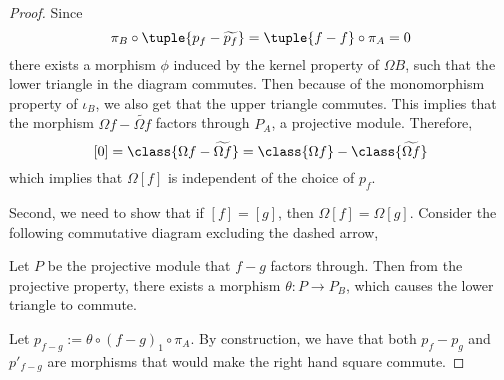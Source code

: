 \begin{proof}
    Since
    \[
        \pi_B \circ \tuple{p_f - \widetilde{p_f}} = \tuple{f - f} \circ \pi_A = 0
    \]
    there exists a morphism \( \phi \) induced by the kernel property of \( \Omega B \), such that the lower triangle in the diagram commutes. Then because of the monomorphism property of \( \iota_B \), we also get that the upper triangle commutes. This implies that the morphism \( \Omega f - \widetilde{\Omega f} \) factors through \( P_A \), a projective module. Therefore,
    \[
        [0] = \class{\Omega f - \widetilde{\Omega f}} = \class{\Omega f} - \class{\widetilde{\Omega f}}
    \]
    which implies that \( \Omega [f] \) is independent of the choice of \( p_f \).

    Second, we need to show that if \( [f] = [g] \), then \( \Omega [f] = \Omega [g] \). Consider the following commutative diagram excluding the dashed arrow,
    \begin{center}
    \end{center}

    Let \( P \) be the projective module that \( f - g \) factors through. Then from the projective property, there exists a morphism \( \theta: P \to P_B \), which causes the lower triangle to commute.

    Let \( p_{f - g} := \theta \circ (f - g)_1 \circ \pi_A \). By construction, we have that both \( p_f - p_g \) and \( p'_{f - g} \) are morphisms that would make the right hand square commute.
    

\end{proof}
